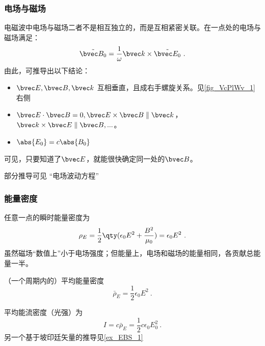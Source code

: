 \subsubsection{电场与磁场}
电磁波中电场与磁场二者不是相互独立的，而是互相紧密关联。在一点处的电场与磁场满足：
\begin{equation}
\tilde {\bvec B_0} = \frac{1}{\omega} \bvec k \times \tilde {\bvec E_0} ~.
\end{equation}
由此，可推导出以下结论：
\begin{itemize}
\item $\bvec E, \bvec B, \bvec k$ 互相垂直，且成右手螺旋关系。见\autoref{fig_VcPlWv_1} 右侧
\item $\bvec E \cdot \bvec B = 0,\bvec E \times \bvec B \parallel \bvec k$，$\bvec k \times \bvec E \parallel \bvec B, ...$。
\item $\abs{E_0}=c\abs{B_0}$
\end{itemize}
可见，只要知道了$\bvec E$，就能很快确定同一处的$\bvec B$。

部分推导可见 “电场波动方程”

\subsubsection{能量密度}
任意一点的瞬时能量密度为
\begin{equation}\label{eq_VcPlWv_2}
\rho_E = \frac{1}{2}\qty(\epsilon_0 E^2 + \frac{B^2}{\mu_0}) = \epsilon_0 E^2~.
\end{equation}
虽然磁场“数值上”小于电场强度；但能量上，电场和磁场的能量相同，各贡献总能量一半。 

（一个周期内的）平均能量密度
\begin{equation}
\bar \rho_E = \frac{1}{2} \epsilon_0 E^2~.
\end{equation}

平均能流密度（光强）为
\begin{equation}
I = c \bar \rho_E = \frac12 c\epsilon_0 E_0^2~.
\end{equation}
另一个基于坡印廷矢量的推导见\autoref{ex_EBS_1}~%


